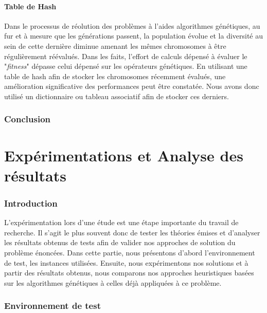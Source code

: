 \documentclass[12pt,a4paper]{article}
\begin{document}
	\subsection{Table de Hash}
	Dans le processus de réolution des problèmes à l'aides algorithmes génétiques, au fur et à mesure que les générations passent, la population évolue et la diversité au sein de cette dernière diminue amenant les mêmes chromosomes à être régulièrement réévalués. Dans les faits, l'effort de calculs dépensé à évaluer le "\emph{fitness}" dépasse celui dépensé sur les opérateurs génétiques. En utilisant une table de hash afin de stocker les chromosomes récemment évalués, une amélioration significative des performances peut être constatée. Nous avons donc utilisé un dictionnaire ou tableau associatif afin de stocker ces derniers.
	
	\section*{Conclusion}
	
	\newpage
	
	\part{Expérimentations et Analyse des résultats}
	\setcounter{section}{0}
		\section*{Introduction}
		L'expérimentation lors d'une étude est une étape importante du travail de recherche. Il s'agit le plus souvent donc de tester les théories émises et d'analyser les résultats obtenus de tests afin de valider nos approches de solution du problème énoncées. Dans cette partie, nous présentons d'abord l'environnement de test, les instances utilisées. Ensuite, nous expérimentons nos solutions et à partir des résultats obtenus, nous comparons nos approches heuristiques basées sur les algorithmes génétiques à celles déjà appliquées à ce problème.
		
		\section{Environnement de test} 
		
\end{document}

